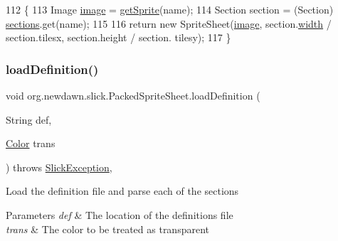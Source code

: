 \begin{DoxyCode}
112                                                    \{
113         Image \mbox{\hyperlink{classorg_1_1newdawn_1_1slick_1_1_packed_sprite_sheet_a3bfe1d01086f84a9f9bdacbfb2f5ceba}{image}} = \mbox{\hyperlink{classorg_1_1newdawn_1_1slick_1_1_packed_sprite_sheet_ac3ba876d0be75c93724ebe035787041e}{getSprite}}(name);
114         Section section = (Section) \mbox{\hyperlink{classorg_1_1newdawn_1_1slick_1_1_packed_sprite_sheet_a7585e251934ce67d5c2a69448e461f29}{sections}}.get(name);
115         
116         \textcolor{keywordflow}{return} \textcolor{keyword}{new} SpriteSheet(\mbox{\hyperlink{classorg_1_1newdawn_1_1slick_1_1_packed_sprite_sheet_a3bfe1d01086f84a9f9bdacbfb2f5ceba}{image}}, section.\mbox{\hyperlink{classorg_1_1newdawn_1_1slick_1_1_image_a7d02c85e21b388428cfe5cc5c82714a1}{width}} / section.tilesx, section.height / section.
      tilesy);
117     \}
\end{DoxyCode}
\mbox{\label{classorg_1_1newdawn_1_1slick_1_1_packed_sprite_sheet_a35e3dcf7f2143738d56291dca1ed620e}} 
\subsubsection{\texorpdfstring{load\+Definition()}{loadDefinition()}}
{\footnotesize\ttfamily void org.\+newdawn.\+slick.\+Packed\+Sprite\+Sheet.\+load\+Definition (\begin{DoxyParamCaption}\item[{String}]{def,  }\item[{\mbox{\hyperlink{classorg_1_1newdawn_1_1slick_1_1_color}{Color}}}]{trans }\end{DoxyParamCaption}) throws \mbox{\hyperlink{classorg_1_1newdawn_1_1slick_1_1_slick_exception}{Slick\+Exception}}\hspace{0.3cm}{\ttfamily [inline]}, {\ttfamily [private]}}

Load the definition file and parse each of the sections


\begin{DoxyParams}{Parameters}
{\em def} & The location of the definitions file \\
\hline
{\em trans} & The color to be treated as transparent \\
\hline
\end{DoxyParams}

